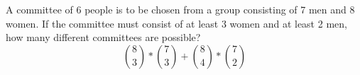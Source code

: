 \item A committee of 6 people is to be chosen from a group consisting of 7 men and 8 women. If the committee must consist of at least 3 women and at least 2 men, how many different committees are possible?
\[ \binom{8}{3} * \binom{7}{3} + \binom{8}{4} * \binom{7}{2} \]    